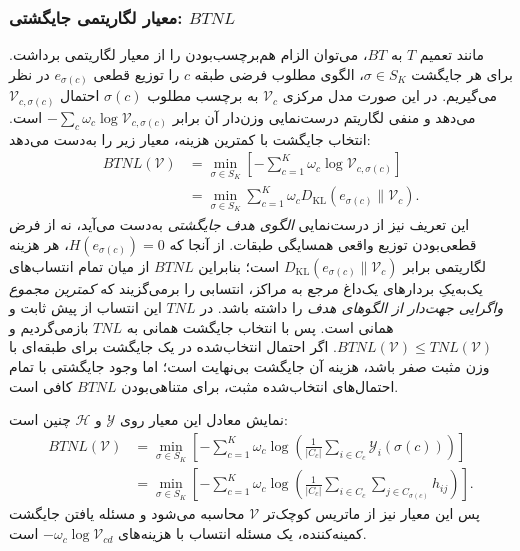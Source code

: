 \subsubsection{معیار لگاریتمی جایگشتی: \texorpdfstring{$BTNL$}{BTNL}}
\label{subsubsec:ch3-BTNL}
مانند تعمیم $T$ به $BT$، می‌توان الزام هم‌برچسب‌بودن را از معیار لگاریتمی برداشت. برای هر جایگشت $\sigma\in S_K$، الگوی مطلوب فرضی طبقه $c$ را توزیع قطعی $e_{\sigma(c)}$ در نظر می‌گیریم. در این صورت مدل مرکزی $\mathcal V_c$ به برچسب مطلوب $\sigma(c)$ احتمال $\mathcal V_{c,\sigma(c)}$ می‌دهد و منفی لگاریتم درست‌نمایی وزن‌دار آن برابر $-\sum_c\omega_c\log\mathcal V_{c,\sigma(c)}$ است. انتخاب جایگشت با کمترین هزینه، معیار زیر را به‌دست می‌دهد:
\begin{equation}\label{eq:ch3-BTNL-on-V}
\boxed{
\begin{aligned}
BTNL(\mathcal V)
&=\min_{\sigma\in S_K}
\left[-\sum_{c=1}^{K}\omega_c
\log\mathcal V_{c,\sigma(c)}\right]\\
&=\min_{\sigma\in S_K}
\sum_{c=1}^{K}\omega_c
D_{\mathrm{KL}}(e_{\sigma(c)}\|\mathcal V_c).
\end{aligned}}
\end{equation}
این تعریف نیز از درست‌نمایی \emph{الگوی هدف جایگشتی}
به‌دست می‌آید، نه از فرض قطعی‌بودن
توزیع واقعی همسایگی طبقات.
از آنجا که $H(e_{\sigma(c)})=0$،
هر هزینه لگاریتمی برابر
$D_{\mathrm{KL}}(e_{\sigma(c)}\|\mathcal V_c)$
است؛ بنابراین $BTNL$ از میان
تمام انتساب‌های یک‌به‌یکِ بردارهای
یک‌داغ مرجع به مراکز، انتسابی را
برمی‌گزیند که \emph{کمترین مجموع
واگرایی جهت‌دار از الگوهای هدف}
را داشته باشد. در $TNL$ این انتساب
از پیش ثابت و همانی است.
پس با انتخاب جایگشت همانی
به $TNL$ بازمی‌گردیم و
$BTNL(\mathcal V)\le TNL(\mathcal V)$.
اگر احتمال انتخاب‌شده در یک جایگشت
برای طبقه‌ای با وزن مثبت صفر باشد،
هزینه آن جایگشت بی‌نهایت است؛
اما وجود جایگشتی با تمام احتمال‌های
انتخاب‌شده مثبت، برای متناهی‌بودن
$BTNL$ کافی است.

نمایش معادل این معیار روی $\mathscr Y$ و $\mathscr H$ چنین است:
\begin{equation}\label{eq:ch3-BTNL-on-Y-H}
\begin{aligned}
BTNL(\mathcal V)
&=\min_{\sigma\in S_K}
\left[-\sum_{c=1}^{K}\omega_c\log
\left(\frac{1}{|C_c|}
\sum_{i\in C_c}\mathscr Y_i(\sigma(c))\right)\right]\\
&=\min_{\sigma\in S_K}
\left[-\sum_{c=1}^{K}\omega_c\log
\left(\frac{1}{|C_c|}
\sum_{i\in C_c}\sum_{j\in C_{\sigma(c)}}h_{ij}\right)\right].
\end{aligned}
\end{equation}
پس این معیار نیز از ماتریس کوچک‌تر $\mathcal V$ محاسبه می‌شود و مسئله یافتن جایگشت کمینه‌کننده، یک مسئله انتساب با هزینه‌های $-\omega_c\log\mathcal V_{cd}$ است.


